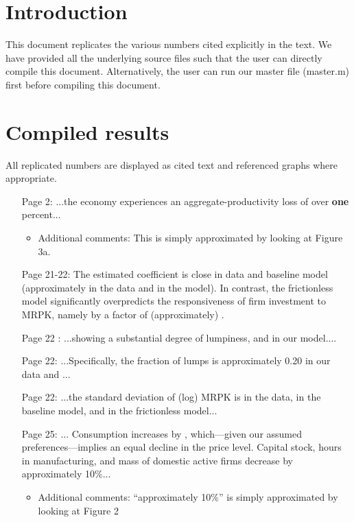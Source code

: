 \documentclass[12pt]{article}
\begin{document}
	
\section{Introduction}

This document replicates the various numbers cited explicitly in the text. We have provided all the underlying source files such that the user can directly compile this document. Alternatively, the user can run our master file (master.m) first before compiling this document.

\section{Compiled results}
All replicated numbers are displayed as cited text and referenced graphs where appropriate.

\begin{itemize}
	\item [Page 2:] ...the economy experiences an aggregate-productivity loss of  over \textbf{one} percent...
	\begin{itemize}
		\item Additional comments: This is simply approximated by looking at Figure 3a.
	\end{itemize}
	\item [Page 21-22:] The estimated coefficient is close in data and baseline model (approximately \ikVmpkdata in the data and \ikVmpkTwoDP \space in the model). In contrast, the frictionless model significantly overpredicts the responsiveness of firm investment to MRPK, namely by a factor of (approximately) \ikVmpkFactor. 
	\item [Page 22]: ...showing a substantial degree of lumpiness, and \lumpyCHp \space in our model....
	\item [Page 22:] ...Specifically, the fraction of lumps is approximately 0.20 in our data and \lumpyBaselinep...
	\item [Page 22:] ...the standard deviation of (log) MRPK is \sdmprk \space in the data, \sdmpk \space in the baseline model, and \sdmpkF \space in the frictionless model...
	\item [Page 25:]... Consumption increases by \delC, which---given our assumed preferences---implies an equal decline in the price level. Capital stock, hours in manufacturing, and mass of domestic active firms decrease by approximately 10\%...
	\begin{itemize}
		\item Additional comments: ``approximately 10\%'' is simply approximated by looking at Figure 2

\end{itemize}
\end{itemize}
\end{document}
